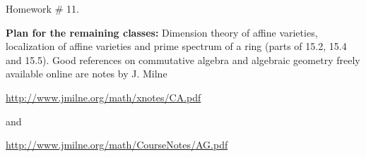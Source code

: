 \documentclass[12pt]{article}
\begin{document}
\baselineskip=16pt
\textheight=8.5in
\textwidth=6in
\parindent=0pt
\def\sk {\hskip .5cm}
\def\skv {\vskip .07cm}
\def\cos {\mbox{cos}}
\def\sin {\mbox{sin}}
\def\tan {\mbox{tan}}
\def\intl{\int\limits}
\def\lm{\lim\limits}
\newcommand{\frc}{\displaystyle\frac}
\def\xbf{{\mathbf x}}
\def\fbf{{\mathbf f}}
\def\gbf{{\mathbf g}}

\def\Ker{{\rm Ker\,}}
\def\Gal{{\rm Gal\,}}
\def\phi{\varphi}

\def\dbA{{\mathbb A}}
\def\dbB{{\mathbb B}}
\def\dbC{{\mathbb C}}
\def\dbD{{\mathbb D}}
\def\dbE{{\mathbb E}}
\def\dbF{{\mathbb F}}
\def\dbG{{\mathbb G}}
\def\dbH{{\mathbb H}}
\def\dbI{{\mathbb I}}
\def\dbJ{{\mathbb J}}
\def\dbK{{\mathbb K}}
\def\dbL{{\mathbb L}}
\def\dbM{{\mathbb M}}
\def\dbN{{\mathbb N}}
\def\dbO{{\mathbb O}}
\def\dbP{{\mathbb P}}
\def\dbQ{{\mathbb Q}}
\def\dbR{{\mathbb R}}
\def\dbS{{\mathbb S}}
\def\dbT{{\mathbb T}}
\def\dbU{{\mathbb U}}
\def\dbV{{\mathbb V}}
\def\dbW{{\mathbb W}}
\def\dbX{{\mathbb X}}
\def\dbY{{\mathbb Y}}
\def\dbZ{{\mathbb Z}}

\def\Aut{{\rm Aut}}
\def\deg{{\rm deg}}

\def\la{{\langle}}
\def\ra{{\rangle}}

\bf\centerline{Homework \# 11. }\rm

{\bf Plan for the remaining classes:} Dimension theory of affine varieties, localization of affine varieties
and prime spectrum of a ring (parts of 15.2, 15.4 and 15.5). Good references on
commutative algebra and algebraic geometry freely available online are notes by 
J. Milne

\centerline{\url{http://www.jmilne.org/math/xnotes/CA.pdf}} 

and 

\centerline{\url{http://www.jmilne.org/math/CourseNotes/AG.pdf}}
\end{document}
